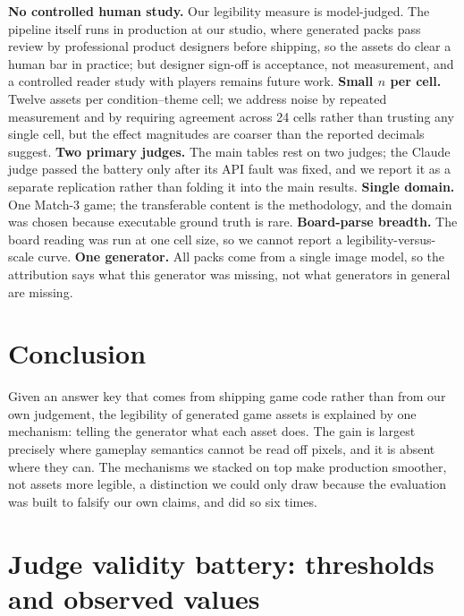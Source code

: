 \documentclass{article}
\begin{document}
\textbf{No controlled human study.} Our legibility measure is model-judged. The pipeline itself
runs in production at our studio, where generated packs pass review by professional product
designers before shipping, so the assets do clear a human bar in practice; but designer sign-off is
acceptance, not measurement, and a controlled reader study with players remains future work.
\textbf{Small $n$ per cell.} Twelve assets per condition--theme cell; we address noise by
repeated measurement and by requiring agreement across 24 cells rather than trusting any single
cell, but the effect magnitudes are coarser than the reported decimals suggest.
\textbf{Two primary judges.} The main tables rest on two judges; the Claude judge passed the
battery only after its API fault was fixed, and we report it as a separate replication rather than
folding it into the main results. \textbf{Single domain.} One Match-3 game; the transferable content is the
methodology, and the domain was chosen because executable ground truth is rare.
\textbf{Board-parse breadth.} The board reading was run at one cell size, so we cannot
report a legibility-versus-scale curve. \textbf{One generator.} All packs come
from a single image model, so the attribution says what this generator was missing, not what
generators in general are missing.

\section{Conclusion}

Given an answer key that comes from shipping game code rather than from our own judgement, the
legibility of generated game assets is explained by one mechanism: telling the generator what each
asset does. The gain is largest precisely where gameplay semantics cannot be read off pixels, and it
is absent where they can. The mechanisms we stacked on top make production smoother, not assets
more legible, a distinction we could only draw because the evaluation was built to falsify our own
claims, and did so six times.

\label{endofbody}

\clearpage




\appendix

\section{Judge validity battery: thresholds and observed values}
\label{app:battery}
\end{document}

